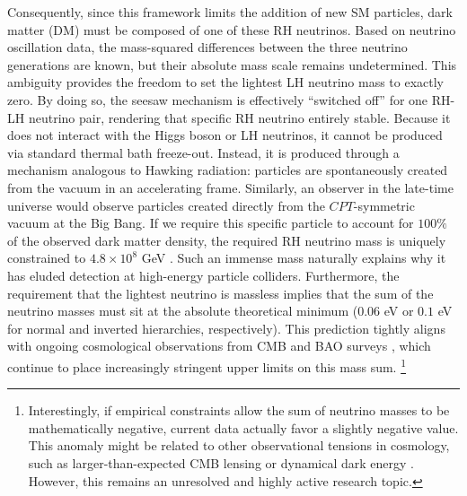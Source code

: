 \documentclass[12pt,a4paper]{report}
\let\cite\parencite
\begin{document}
Consequently, since this framework limits the addition of new SM particles, dark matter (DM) must be composed of one of these RH neutrinos. Based on neutrino oscillation data, the mass-squared differences between the three neutrino generations are known, but their absolute mass scale remains undetermined. This ambiguity provides the freedom to set the lightest LH neutrino mass to exactly zero. By doing so, the seesaw mechanism is effectively ``switched off'' for one RH-LH neutrino pair, rendering that specific RH neutrino entirely stable. Because it does not interact with the Higgs boson or LH neutrinos, it cannot be produced via standard thermal bath freeze-out. Instead, it is produced through a mechanism analogous to Hawking radiation: particles are spontaneously created from the vacuum in an accelerating frame. Similarly, an observer in the late-time universe would observe particles created directly from the $CPT$-symmetric vacuum at the Big Bang. If we require this specific particle to account for $100\%$ of the observed dark matter density, the required RH neutrino mass is uniquely constrained to $4.8\times 10^8 $ GeV \cite{2018PhRvL.121y1301B, 2022AnPhy.43868767B}. Such an immense mass naturally explains why it has eluded detection at high-energy particle colliders. Furthermore, the requirement that the lightest neutrino is massless implies that the sum of the neutrino masses must sit at the absolute theoretical minimum ($0.06$ eV or $0.1$ eV for normal and inverted hierarchies, respectively). This prediction tightly aligns with ongoing cosmological observations from CMB and BAO surveys \cite{Adame_2025, PhysRevD.111.083535}, which continue to place increasingly stringent upper limits on this mass sum. \footnote{Interestingly, if empirical constraints allow the sum of neutrino masses to be mathematically negative, current data actually favor a slightly negative value. This anomaly might be related to other observational tensions in cosmology, such as larger-than-expected CMB lensing or dynamical dark energy \cite{PhysRevD.111.083507}. However, this remains an unresolved and highly active research topic.}
\end{document}
